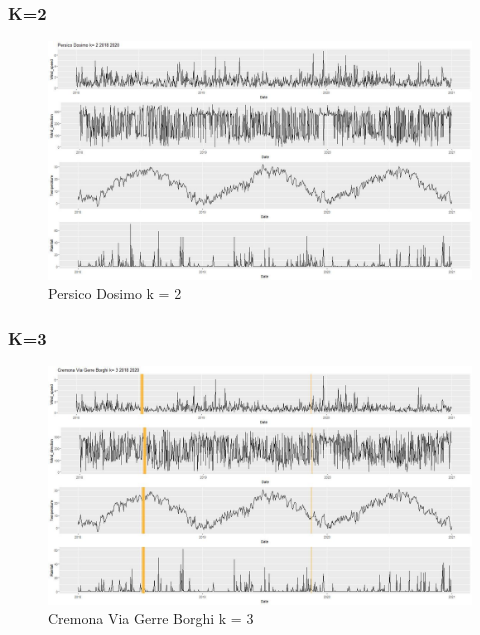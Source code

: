 \documentclass{article}
\begin{document}
\subsubsection{K=2}
\begin{figure}[H]
  \centering 
  \includegraphics[scale = 0.3]{Picture/2/Persico Dosimo k= 2 2018 2020 .jpeg}
  \caption{Persico Dosimo k = 2}
  \centering
\end{figure}
\subsubsection{K=3}
\begin{figure}[H]
  \centering 
  \includegraphics[scale = 0.3]{Picture/3/Cremona Via Gerre Borghi k= 3 2018 2020 .jpeg}
  \caption{Cremona Via Gerre Borghi k = 3}
  \centering
\end{figure}
\end{document}
